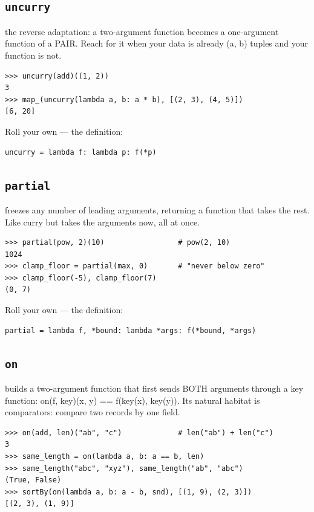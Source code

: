 \documentclass[10pt,letterpaper]{book}
\begin{document}
\subsection{\texttt{uncurry}}\label{def:uncurry}
the reverse adaptation: a two-argument function becomes a one-argument function of a PAIR. Reach for it when your data is already (a, b) tuples and your function is not.
\begin{lstlisting}[style=ex]
>>> uncurry(add)((1, 2))
3
>>> map_(uncurry(lambda a, b: a * b), [(2, 3), (4, 5)])
[6, 20]
\end{lstlisting}

Roll your own --- the definition:

\begin{lstlisting}[style=ex]
uncurry = lambda f: lambda p: f(*p)
\end{lstlisting}
\subsection{\texttt{partial}}\label{def:partial}
freezes any number of leading arguments, returning a function that takes the rest. Like curry but takes the arguments now, all at once.
\begin{lstlisting}[style=ex]
>>> partial(pow, 2)(10)                 # pow(2, 10)
1024
>>> clamp_floor = partial(max, 0)       # "never below zero"
>>> clamp_floor(-5), clamp_floor(7)
(0, 7)
\end{lstlisting}

Roll your own --- the definition:

\begin{lstlisting}[style=ex]
partial = lambda f, *bound: lambda *args: f(*bound, *args)
\end{lstlisting}
\subsection{\texttt{on}}\label{def:on}
builds a two-argument function that first sends BOTH arguments through a key function: on(f, key)(x, y) == f(key(x), key(y)). Its natural habitat is comparators: compare two records by one field.
\begin{lstlisting}[style=ex]
>>> on(add, len)("ab", "c")             # len("ab") + len("c")
3
>>> same_length = on(lambda a, b: a == b, len)
>>> same_length("abc", "xyz"), same_length("ab", "abc")
(True, False)
>>> sortBy(on(lambda a, b: a - b, snd), [(1, 9), (2, 3)])
[(2, 3), (1, 9)]
\end{lstlisting}
\end{document}

